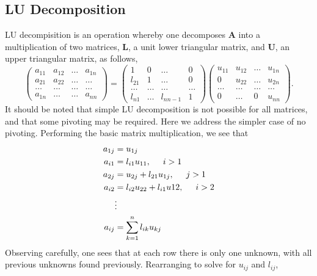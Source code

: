\documentclass[11pt,a4paper]{article}
\begin{document}
\subsection{LU Decomposition}

LU decompisition is an operation whereby one decomposes {\bf A} into a multiplication of two matrices, {\bf L}, a unit lower triangular matrix, and {\bf U}, an upper triangular matrix, as follows,
\begin{equation*}
\left(\begin{array}{cccc}
			a_{11} & a_{12} & \dots & a_{1n} \\
			a_{21} & a_{22} & \dots & \dots \\
			\dots & \dots & \dots & \dots \\
			a_{1n} & \dots & \dots & a_{nn} \end{array} \right)
	=\left(\begin{array}{cccc}
			1 & 0 & \dots & 0 \\
			l_{21} & 1 & \dots & 0 \\
			\dots & \dots & \dots & \dots \\
			l_{n1} & \dots & l_{nn-1} & 1 \end{array} \right)
		\left(\begin{array}{cccc}
			u_{11} & u_{12} & \dots & u_{1n} \\
			0 & u_{22} & \dots & u_{2n} \\
			\dots & \dots & \dots & \dots \\
			0 & \dots & 0 & u_{nn} \end{array} \right).
\end{equation*}
It should be noted that simple LU decomposition is not possible for all matrices, and that some pivoting may be required. Here we address the simpler case of no pivoting.
Performing the basic matrix multiplication, we see that
\begin{align*}
a_{1j} &= u_{1j} \\
a_{i1} &= l_{i1}u_{11}, \hspace{0.5 cm} i>1 \\
a_{2j} &= u_{2j} + l_{21}u_{1j}, \hspace{0.5 cm} j>1 \\
a_{i2} &= l_{i2}u_{22} + l_{i1}u{12}, \hspace{0.5 cm} i>2 \\
&\vdots \\
a_{ij} &= \sum\limits_{k=1}^n l_{ik}u_{kj}
\end{align*}
Observing carefully, one sees that at each row there is only one unknown, with all previous unknowns found previously. Rearranging to solve for $u_{ij}$ and $l_{ij}$,
\end{document}
